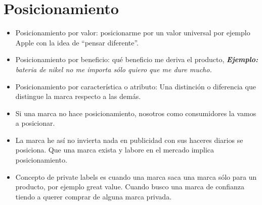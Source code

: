 \section{Posicionamiento}   
\begin{itemize}
    \item Posicionamiento por valor: posicionarme por  un valor universal por ejemplo Apple con la idea de ``pensar diferente''.
    \item Posicionamiento por beneficio: qué beneficio me deriva el producto, \emph{\textbf{Ejemplo: }bateria de nikel no me importa sólo quiero que me dure mucho.}
    \item Posicionamiento por característica o atributo: Una distinción o diferencia que distingue la marca respecto a las demás.
\end{itemize}
\begin{itemize}[label=\#]
    \item Si una marca no hace posicionamiento, nosotros como consumidores la vamos a posicionar. 
    \item La marca he así no invierta nada en publicidad con sus haceres diarios se posiciona. Que una marca exista y labore en el mercado implica posicionamiento.
    \item Concepto de private labels es cuando una marca saca una marca sólo para un producto, por ejemplo great value. Cuando busco una marca de confianza tiendo a querer comprar de alguna marca privada.
\end{itemize}


